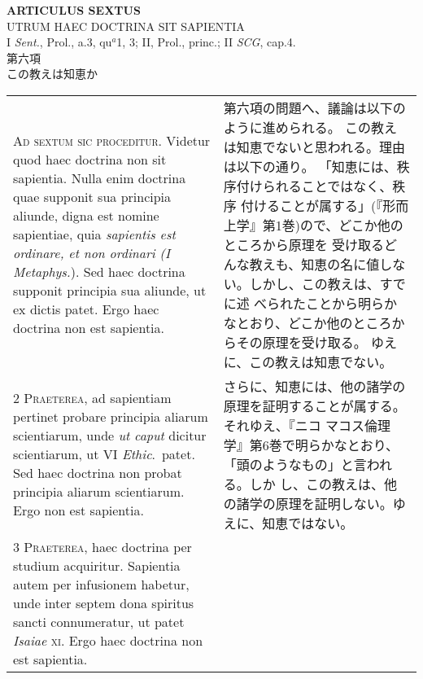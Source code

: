 \documentclass[10pt]{jsarticle} %
\begin{document}
\begin{center}
 {\Large {\bf ARTICULUS SEXTUS}}\\
 {\large UTRUM HAEC DOCTRINA SIT SAPIENTIA}\\
 {\footnotesize I {\itshape Sent.}, Prol., a.3, qu$^a$1, 3; II, Prol.,
 princ.; II {\itshape SCG}, cap.4.}\\
 {\Large 第六項\\この教えは知恵か}
\end{center}

\begin{longtable}{p{21em}p{21em}}



{\Huge A}{\scshape d sextum sic proceditur}. Videtur quod haec
doctrina non sit sapientia. Nulla enim doctrina quae supponit sua
principia aliunde, digna est nomine sapientiae, quia {\itshape sapientis est
ordinare, et non ordinari (I Metaphys.}). Sed haec doctrina supponit
principia sua aliunde, ut ex dictis patet. Ergo haec doctrina non est
sapientia.


&

第六項の問題へ、議論は以下のように進められる。
この教えは知恵でないと思われる。理由は以下の通り。
「知恵には、秩序付けられることではなく、秩序
 付けることが属する」(『形而上学』第1巻)ので、どこか他のところから原理を
 受け取るどんな教えも、知恵の名に値しない。しかし、この教えは、すでに述
 べられたことから明らかなとおり、どこか他のところからその原理を受け取る。
ゆえに、この教えは知恵でない。

\\


{\scshape 2 Praeterea}, ad sapientiam pertinet probare
principia aliarum scientiarum, unde {\itshape ut caput} dicitur scientiarum, ut VI
{\itshape Ethic}.~patet. Sed haec doctrina non probat principia aliarum
scientiarum. Ergo non est sapientia.


&

さらに、知恵には、他の諸学の原理を証明することが属する。それゆえ、『ニコ
 マコス倫理学』第6巻で明らかなとおり、「頭のようなもの」と言われる。しか
 し、この教えは、他の諸学の原理を証明しない。ゆえに、知恵ではない。


\\


{\scshape 3 Praeterea}, haec doctrina per studium
acquiritur. Sapientia autem per infusionem habetur, unde inter septem
dona spiritus sancti connumeratur, ut patet {\itshape Isaiae} {\scshape xi}. Ergo haec
doctrina non est sapientia.



\end{longtable}
\end{document}
